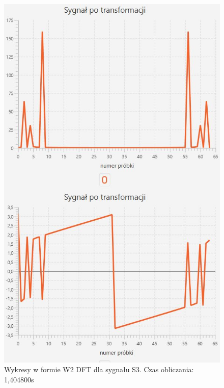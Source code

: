 \documentclass[12pt]{article}
\begin{document}
\begin{figure}[H]
	\centering
	\includegraphics[width=.8\linewidth]{DFT-S3-W2}
	\caption{Wykresy w formie W2 DFT dla sygnału S3. Czas obliczania: 1,404800s}
	\label{S3_sygnal}
\end{figure}
\end{document}

